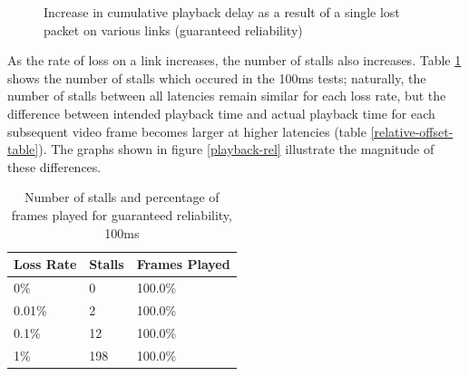 \documentclass{mpaper}
\begin{document}
\begin{figure}
{   \label{single-150}
 }
 \caption{Increase in cumulative playback delay as a result of a single lost packet on various links (guaranteed reliability)}
 \label{single-rel}
\end{figure}

As the rate of loss on a link increases, the number of stalls also increases. Table \ref{reliable-stalls} shows the number of stalls which occured in the 100ms tests; naturally, the number of stalls between all latencies remain similar for each loss rate, but the difference between intended playback time and actual playback time for each subsequent video frame becomes larger at higher latencies (table \ref{relative-offset-table}). The graphs shown in figure \ref{playback-rel} illustrate the magnitude of these differences.

\begin{table}[h!]
\centering
\label{stalls-data-rel}
\begin{center}
\begin{tabular}{|p{2cm}|p{2cm}|p{2cm}|}
\hline
Loss Rate & Stalls & Frames Played\\ \hline
0\% & 0 & 100.0\% \\ \hline
0.01\%  & 2 & 100.0\% \\ \hline
0.1\%  & 12 & 100.0\% \\ \hline
1\%  & 198 & 100.0\% \\ \hline

\end{tabular}
\caption{Number of stalls and percentage of frames played for guaranteed reliability, 100ms}
\label{reliable-stalls}
\end{center}
\end{table}
\end{document}
